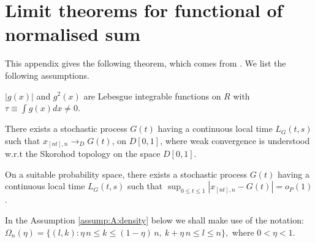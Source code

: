 \chapter{Limit theorems for functional of normalised sum}

This appendix gives the following theorem, which comes from \cite{wangphillips2010a}. We list the following assumptions.

\begin{assump} 
$|g(x)|$ and $g^2(x)$ are Lebesgue integrable functions on $R$ with $\tau \equiv \int g(x) dx \ne 0$.
\end{assump}

\begin{assump} 
There exists a stochastic process $G(t)$ having a continuous local time $L_{G}(t,s)$ such that $x_{[nt],n}\to_D G(t)$, on $D[0,1]$, where weak convergence is understood w.r.t the Skorohod topology on the space $D[0,1]$.
\end{assump}

\newenvironment{assump_1}{ \par \medskip\noindent  {\bf Assumption \ref{assump:A:weakConvergence}*.}}{\par\medskip}

\begin{assump_1} 
On a suitable probability space, there exists a stochastic process $G(t)$ having a continuous local time $L_G(t, s)$ such that $\sup_{0 \le t \le 1} | x_{[nt], n} - G(t) | = o_P(1)$.
\end{assump_1}

In the Assumption \ref{assump:A:density} below we shall make use of the notation: $ \Omega_n(\eta)=\big\{(l,k): \eta\, n\le k\le (1-\eta)\, n,\ k+\eta \, n\le l\le n \big\},$ where $0<\eta<1$.

